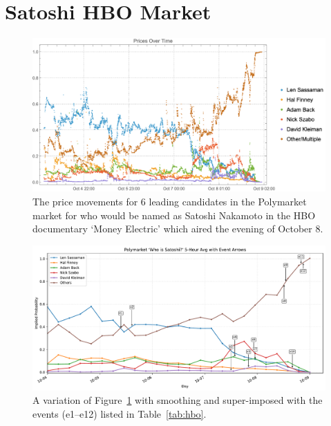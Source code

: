 













\section{Satoshi HBO Market}
\label{app:hbo}

\begin{figure}
  \centering
  \includegraphics[width=\textwidth]{figures/graph.png}
  \caption{The price movements for 6 leading candidates in the Polymarket market for who would be named as Satoshi Nakamoto in the HBO documentary `Money Electric' which aired the evening of October 8.}
  \label{fig:example}
\end{figure}

\begin{figure}
  \centering
  \includegraphics[width=\textwidth]{figures/graph2.pdf}
  \caption{A variation of Figure~\ref{fig:example} with smoothing and super-imposed with the events (e1--e12) listed in Table~\ref{tab:hbo}.}
  \label{fig:example2}
\end{figure}

